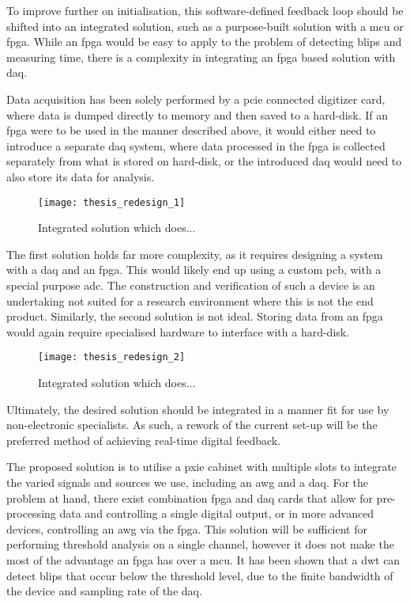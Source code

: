 To improve further on initialisation, this software-defined feedback loop should be shifted into an integrated solution, such as a purpose-built solution with a \gls{mcu} or \gls{fpga}. While an \gls{fpga} would be easy to apply to the problem of detecting blips and measuring time, there is a complexity in integrating an \gls{fpga} based solution with \gls{daq}. 

Data acquisition has been solely performed by a \gls{pcie} connected digitizer card, where data is dumped directly to memory and then saved to a hard-disk. If an \gls{fpga} were to be used in the manner described above, it would either need to introduce a separate \gls{daq} system, where data processed in the \gls{fpga} is collected separately from what is stored on hard-disk, or the introduced \gls{daq} would need to also store its data for analysis.

\begin{figure}[htbp]
	\centering
	\texttt{[image: thesis\_redesign\_1]}
	\caption{Integrated solution which does...}
	\label{fig::redesign_1}
\end{figure}

The first solution holds far more complexity, as it requires designing a system with a \gls{daq} and an \gls{fpga}. This would likely end up using a custom \gls{pcb}, with a special purpose \gls{adc}. The construction and verification of such a device is an undertaking not suited for a research environment where this is not the end product. Similarly, the second solution is not ideal. Storing data from an \gls{fpga} would again require specialised hardware to interface with a hard-disk. 



\begin{figure}[htbp]
	\centering
	\texttt{[image: thesis\_redesign\_2]}
	\caption{Integrated solution which does...}
	\label{fig::redesign_2}
\end{figure}

Ultimately, the desired solution should be integrated in a manner fit for use by non-electronic specialists. As such, a rework of the current set-up will be the preferred method of achieving real-time digital feedback.

The proposed solution is to utilise a \gls{pxie} cabinet with multiple slots to integrate the varied signals and sources we use, including an \gls{awg} and a \gls{daq}. For the problem at hand, there exist combination \gls{fpga} and \gls{daq} cards that allow for pre-processing data and controlling a single digital output, or in more advanced devices, controlling an \gls{awg} via the \gls{fpga}. This solution will be sufficient for performing threshold analysis on a single channel, however it does not make the most of the advantage an \gls{fpga} has over a \gls{mcu}. It has been shown  that a \gls{dwt} can detect blips that occur below the threshold level, due to the finite bandwidth of the device and sampling rate of the \gls{daq}.

